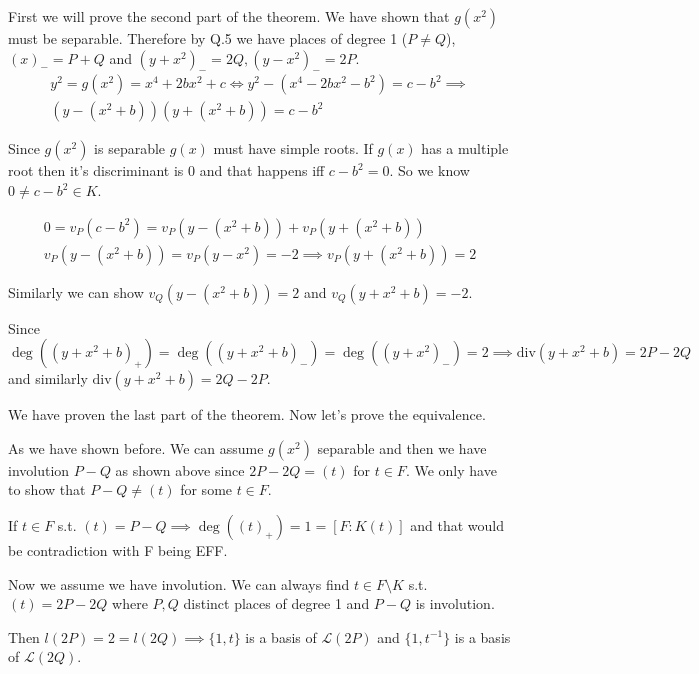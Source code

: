 \documentclass[12pt, a4paper]{article}
\begin{document}
First we will prove the second part of the theorem. We have shown that $g(x^2)$ must be separable. Therefore by Q.5 we have places of degree 1 ($P\neq Q$), $(x)_{-} = P+Q$ and $(y+x^2)_{-}=2Q, (y-x^2)_{-} = 2P$.
\begin{gather*}
y^2=g(x^2) = x^4+2bx^2+c \iff y^2-(x^4-2bx^2-b^2) = c - b^2 \implies \\
(y-(x^2+b))(y+(x^2+b))=c-b^2
\end{gather*}

Since $g(x^2)$ is separable $g(x)$ must have simple roots. If $g(x)$ has a multiple root then it's discriminant is 0 and that happens iff $c-b^2=0$. So we know $0 \neq c-b^2 \in K$.

\begin{gather*}
0=v_P(c-b^2)=v_P(y-(x^2+b)) + v_P(y+(x^2+b))\\
v_P(y-(x^2+b)) = v_P(y-x^2) = -2 \implies v_P(y+(x^2+b)) = 2
\end{gather*}

Similarly we can show $v_Q(y-(x^2+b)) = 2$ and $v_Q(y+x^2+b)=-2$. 

Since $\deg((y+x^2+b)_{+}) = \deg((y+x^2+b)_{-}) = \deg((y+x^2)_{-}) = 2 \implies \text{div}(y+x^2+b) = 2P - 2Q$ and similarly $\text{div}(y+x^2+b) = 2Q - 2P$.

We have proven the last part of the theorem. Now let's prove the equivalence.

As we have shown before. We can assume $g(x^2)$ separable and then we have involution $P-Q$ as shown above since $2P-2Q = (t)$ for $t \in F$. We only have to show that $P-Q \neq (t)$ for some $t \in F$. 

If $t \in F$ s.t. $(t) = P - Q \implies \deg((t)_{+}) = 1 = [F:K(t)]$ and that would be contradiction with F being EFF.

Now we assume we have involution. We can always find $t \in F \setminus K$ s.t. $(t) = 2P-2Q$ where $P,Q$ distinct places of degree 1 and $P-Q$ is involution.

Then $l(2P) = 2 = l(2Q) \implies \{1,t\}$ is a basis of $\mathcal{L}(2P)$ and $\{1,t^{-1}\}$ is a basis of $\mathcal{L}(2Q)$.
\end{document}
